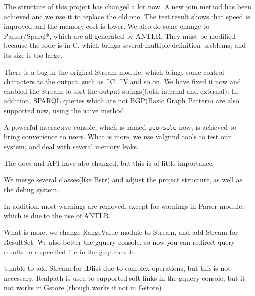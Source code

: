 \documentclass[titlepage, a4paper, 12pt]{article}
\begin{document}

The structure of this project has changed a lot now. A new join method
has been achieved and we use it to replace the old one. The test result
shows that speed is improved and the memory cost is lower. We also do
some change to Parser/Sparql*, which are all generated by ANTLR. They
must be modified because the code is in C, which brings several multiple
definition problems, and its size is too large.

There is a bug in the original Stream module, which brings some control
characters to the output, such as \^{}C, \^{}V and so on. We have fixed
it now and enabled the Stream to sort the output strings(both internal
and external). In addition, SPARQL queries which are not BGP(Basic Graph
Pattern) are also supported now, using the naive method.

A powerful interactive console, which is named \texttt{gconsole} now, is
achieved to bring convenience to users. What is more, we use valgrind
tools to test our system, and deal with several memory leaks.

The docs and API have also changed, but this is of little importance.


We merge several classes(like Bstr) and adjust the project structure, as
well as the debug system.

In addition, most warnings are removed, except for warnings in Parser
module, which is due to the use of ANTLR.

What is more, we change RangeValue module to Stream, and add Stream for
ResultSet. We also better the gquery console, so now you can redirect
query results to a specified file in the gsql console.

Unable to add Stream for IDlist due to complex operations, but this is
not necessary. Realpath is used to supported soft links in the gquery
console, but it not works in Gstore.(though works if not in Gstore)

\end{document}
